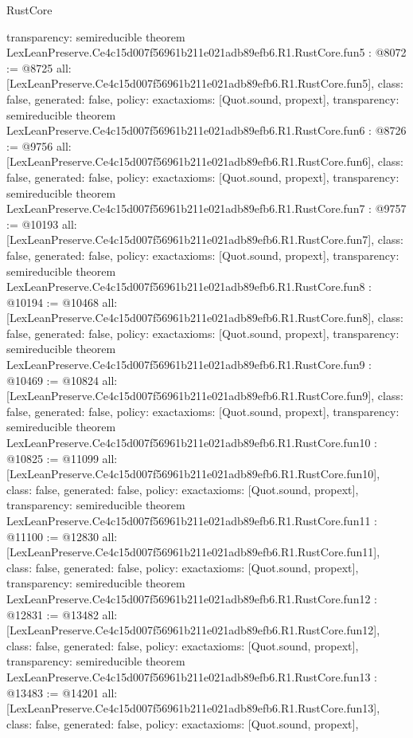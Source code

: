 \begin{lexlean}{RustCore}
\begin{coremodule}
{  transparency: semireducible
}
theorem LexLeanPreserve.Ce4c15d007f56961b211e021adb89efb6.R1.RustCore.fun5 : @8072 := @8725 {
  all: [LexLeanPreserve.Ce4c15d007f56961b211e021adb89efb6.R1.RustCore.fun5],
  class: false,
  generated: false,
  policy: exact{axioms: [Quot.sound, propext]},
  transparency: semireducible
}
theorem LexLeanPreserve.Ce4c15d007f56961b211e021adb89efb6.R1.RustCore.fun6 : @8726 := @9756 {
  all: [LexLeanPreserve.Ce4c15d007f56961b211e021adb89efb6.R1.RustCore.fun6],
  class: false,
  generated: false,
  policy: exact{axioms: [Quot.sound, propext]},
  transparency: semireducible
}
theorem LexLeanPreserve.Ce4c15d007f56961b211e021adb89efb6.R1.RustCore.fun7 : @9757 := @10193 {
  all: [LexLeanPreserve.Ce4c15d007f56961b211e021adb89efb6.R1.RustCore.fun7],
  class: false,
  generated: false,
  policy: exact{axioms: [Quot.sound, propext]},
  transparency: semireducible
}
theorem LexLeanPreserve.Ce4c15d007f56961b211e021adb89efb6.R1.RustCore.fun8 : @10194 := @10468 {
  all: [LexLeanPreserve.Ce4c15d007f56961b211e021adb89efb6.R1.RustCore.fun8],
  class: false,
  generated: false,
  policy: exact{axioms: [Quot.sound, propext]},
  transparency: semireducible
}
theorem LexLeanPreserve.Ce4c15d007f56961b211e021adb89efb6.R1.RustCore.fun9 : @10469 := @10824 {
  all: [LexLeanPreserve.Ce4c15d007f56961b211e021adb89efb6.R1.RustCore.fun9],
  class: false,
  generated: false,
  policy: exact{axioms: [Quot.sound, propext]},
  transparency: semireducible
}
theorem LexLeanPreserve.Ce4c15d007f56961b211e021adb89efb6.R1.RustCore.fun10 : @10825 := @11099 {
  all: [LexLeanPreserve.Ce4c15d007f56961b211e021adb89efb6.R1.RustCore.fun10],
  class: false,
  generated: false,
  policy: exact{axioms: [Quot.sound, propext]},
  transparency: semireducible
}
theorem LexLeanPreserve.Ce4c15d007f56961b211e021adb89efb6.R1.RustCore.fun11 : @11100 := @12830 {
  all: [LexLeanPreserve.Ce4c15d007f56961b211e021adb89efb6.R1.RustCore.fun11],
  class: false,
  generated: false,
  policy: exact{axioms: [Quot.sound, propext]},
  transparency: semireducible
}
theorem LexLeanPreserve.Ce4c15d007f56961b211e021adb89efb6.R1.RustCore.fun12 : @12831 := @13482 {
  all: [LexLeanPreserve.Ce4c15d007f56961b211e021adb89efb6.R1.RustCore.fun12],
  class: false,
  generated: false,
  policy: exact{axioms: [Quot.sound, propext]},
  transparency: semireducible
}
theorem LexLeanPreserve.Ce4c15d007f56961b211e021adb89efb6.R1.RustCore.fun13 : @13483 := @14201 {
  all: [LexLeanPreserve.Ce4c15d007f56961b211e021adb89efb6.R1.RustCore.fun13],
  class: false,
  generated: false,
  policy: exact{axioms: [Quot.sound, propext]},
}
\end{coremodule}
\end{lexlean}
